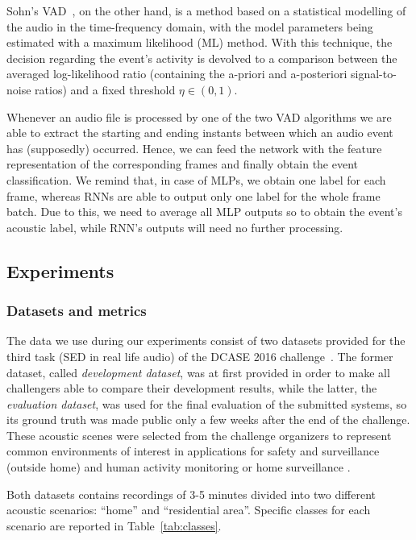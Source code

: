 Sohn's VAD~\cite{sohn1999statistical}, on the other hand, is a method based on a statistical modelling of the audio in the time-frequency domain, with the model parameters being estimated with a maximum likelihood (ML) method. With this technique, the decision regarding the event's activity is devolved to a comparison between the averaged log-likelihood ratio (containing the a-priori and a-posteriori signal-to-noise ratios) and a fixed threshold $\eta \in (0,1)$. 

Whenever an audio file is processed by one of the two VAD algorithms we are able to extract the starting and ending instants between which an audio event has (supposedly) occurred. Hence, we can feed the network with the feature representation of the corresponding frames and finally obtain the event classification. We remind that, in case of MLPs, we obtain one label for each frame, whereas RNNs are able to output only one label for the whole frame batch. Due to this, we need to average all MLP outputs so to obtain the event's acoustic label, while RNN's outputs will need no further processing.

\subsection{Experiments}


\subsubsection{Datasets and metrics}
\label{sec:dcase2016-dataset}
The data we use during our experiments consist of two datasets provided for the third task (SED in real life audio) of the DCASE 2016 challenge~\cite{mesaros2016tut}. 
The former dataset, called \emph{development dataset}, was at first provided in order to make all challengers able to compare their development results, while the latter, the \emph{evaluation dataset}, was used for the final evaluation of the submitted systems, so its ground truth was made public only a few weeks after the end of the challenge. These acoustic scenes were selected from the challenge organizers to represent common environments of interest in applications for safety and surveillance (outside home) and human activity monitoring or home surveillance \cite{mesaros2016tut}.

Both datasets contains recordings of 3-5 minutes divided into two different acoustic scenarios: ``home'' and ``residential area''. Specific classes for each scenario are reported in Table~\ref{tab:classes}. 

